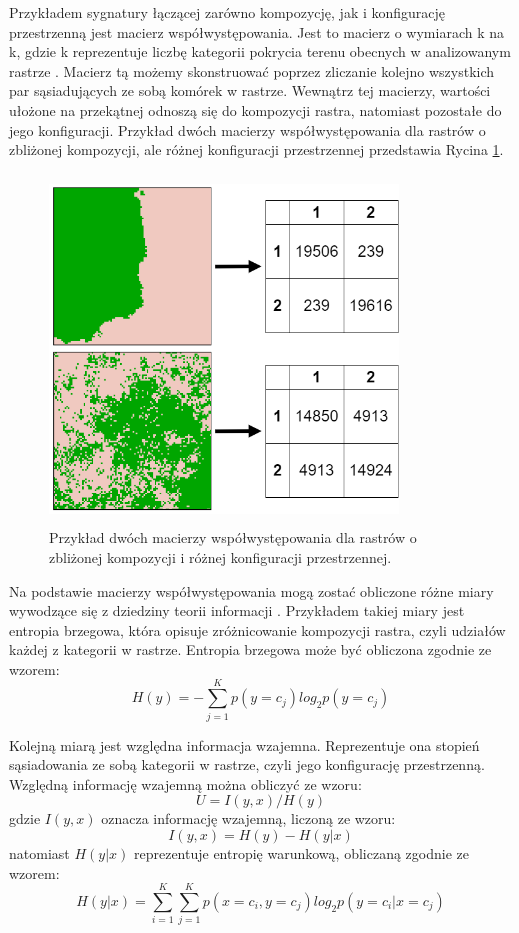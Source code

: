 \documentclass{amuthesis}
\begin{document}
Przykładem sygnatury łączącej zarówno kompozycję, jak i konfigurację
przestrzenną jest macierz współwystępowania. Jest to macierz o wymiarach
k na k, gdzie k reprezentuje liczbę kategorii pokrycia terenu obecnych w
analizowanym rastrze \autocite{Haralick_1973,Jasiewicz_GeoPAT}. Macierz
tą możemy skonstruować poprzez zliczanie kolejno wszystkich par
sąsiadujących ze sobą komórek w rastrze. Wewnątrz tej macierzy, wartości
ułożone na przekątnej odnoszą się do kompozycji rastra, natomiast
pozostałe do jego konfiguracji. Przykład dwóch macierzy
współwystępowania dla rastrów o zbliżonej kompozycji, ale różnej
konfiguracji przestrzennej przedstawia Rycina \ref{fig-metody-coma}.

\begin{figure}[t]

{\centering \includegraphics[width=3.64583in,height=3.64583in]{figures/diagram_coma.png}

}

\caption{\label{fig-metody-coma}Przykład dwóch macierzy
współwystępowania dla rastrów o zbliżonej kompozycji i różnej
konfiguracji przestrzennej.}

\end{figure}

Na podstawie macierzy współwystępowania mogą zostać obliczone różne
miary wywodzące się z dziedziny teorii informacji \autocite{nowosad_it}.
Przykładem takiej miary jest entropia brzegowa, która opisuje
zróżnicowanie kompozycji rastra, czyli udziałów każdej z kategorii w
rastrze. Entropia brzegowa może być obliczona zgodnie ze wzorem: \[
H(y) = -\sum_{j=1}^{K}p(y=c_{j})log_2p(y=c_j)
\]

Kolejną miarą jest względna informacja wzajemna. Reprezentuje ona
stopień sąsiadowania ze sobą kategorii w rastrze, czyli jego
konfigurację przestrzenną. Względną informację wzajemną można obliczyć
ze wzoru: \[
U = I(y,x)/H(y)
\] gdzie \(I(y,x)\) oznacza informację wzajemną, liczoną ze wzoru: \[
I(y,x) = H(y) - H(y|x)
\] natomiast \(H(y|x)\) reprezentuje entropię warunkową, obliczaną
zgodnie ze wzorem: \[
H(y|x) = \sum_{i=1}^{K}\sum_{j=1}^{K} p(x=c_i, y=c_j) log_2 p(y=c_i | x=c_j)
\]
\end{document}
